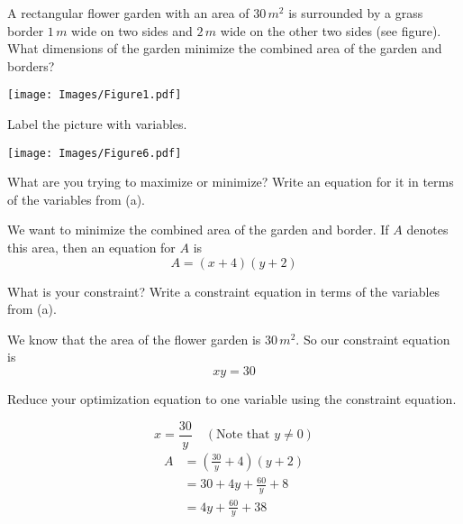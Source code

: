 \documentclass[handout,nooutcomes]{ximera}
\renewenvironment{freeResponse}{
\ifhandout\setbox0\vbox\bgroup\else
\begin{trivlist}\item[\hskip \labelsep\bfseries Solution:\hspace{2ex}]
\fi}
{\ifhandout\egroup\else
\end{trivlist}
\fi}
\begin{document}
\begin{problem}
  A rectangular flower garden with an area of $30 \, m^2$ is surrounded by a grass border $1 \, m$ wide on two sides and $2 \, m$ wide on the other two sides (see figure).
  What dimensions of the garden minimize the combined area of the garden and borders?
  
  \begin{image}
    \texttt{[image: Images/Figure1.pdf]}
  \end{image}

  \begin{enumerate}
    \item  Label the picture with variables.
      \begin{freeResponse}
        \begin{image}
          \texttt{[image: Images/Figure6.pdf]}
	\end{image}
      \end{freeResponse}

    \item  What are you trying to maximize or minimize?
      Write an equation for it in terms of the variables from (a).
      \begin{freeResponse}
        We want to minimize the combined area of the garden and border.  If $A$ denotes this area, then an equation for $A$ is
        $$ A = (x+4)(y+2) $$
      \end{freeResponse}

    \item  What is your constraint?
      Write a constraint equation in terms of the variables from (a).
      \begin{freeResponse}
        We know that the area of the flower garden is $30 \, m^2$.  So our constraint equation is
        $$ xy = 30 $$
      \end{freeResponse}
      
    \item  Reduce your optimization equation to one variable using the constraint equation.
      \begin{freeResponse}
        $$ x = \frac{30}{y} \quad (\text{Note that } y \neq 0) $$
        \begin{align}
          A &= \left( \frac{30}{y} + 4 \right)(y+2) \\
            &= 30 + 4y + \frac{60}{y} + 8 \\
            &=4y + \frac{60}{y} + 38 \label{eqn3}
        \end{align}
      \end{freeResponse}
		

\end{enumerate}
\end{problem}
\end{document}
